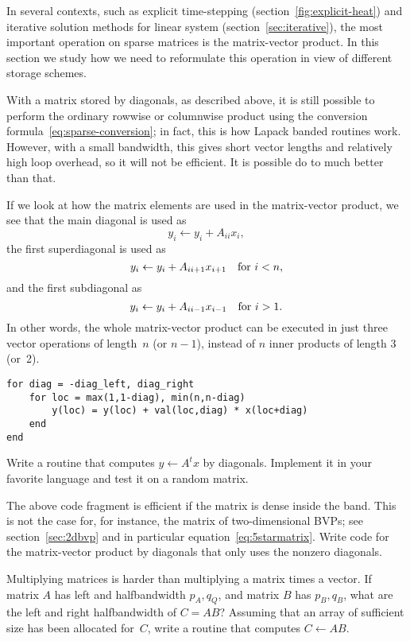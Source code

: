 In several contexts,
such as explicit time-stepping (section~\ref{fig:explicit-heat})
and iterative solution methods for linear system (section~\ref{sec:iterative}),
the most important operation on sparse matrices is the matrix-vector
product.
In this section we study how we need to reformulate this operation
in view of different storage schemes.

With a matrix stored by diagonals, as described above, it is
still possible to perform the ordinary rowwise or columnwise product using the
conversion formula~\eqref{eq:sparse-conversion};
in fact, this is how Lapack banded routines work.
%
However, with
a small bandwidth, this gives short vector lengths and relatively high
loop overhead, so it will not be efficient. It is possible do to much
better than that.

If we look at how the matrix elements are used in the matrix-vector
product, we see that the main diagonal is used as
\[ y_i \leftarrow y_i + A_{ii} x_i, \]
the first superdiagonal is used as
\[ y_i \leftarrow y_i + A_{ii+1} x_{i+1}\quad\hbox{for $i<n$}, \]
and the first subdiagonal as
\[ y_i \leftarrow y_i + A_{ii-1} x_{i-1}\quad\hbox{for $i>1$}. \]
In other words, the whole matrix-vector product can be executed in
just three vector operations of length~$n$ (or $n-1$), instead of $n$
inner products of length 3 (or~2).

\begin{verbatim}
for diag = -diag_left, diag_right
    for loc = max(1,1-diag), min(n,n-diag)
        y(loc) = y(loc) + val(loc,diag) * x(loc+diag)
    end
end
\end{verbatim}

\begin{exercise}
  Write a routine that computes $y\leftarrow A^tx$ by
  diagonals. Implement it in your favorite language and test it on a
  random matrix.
\end{exercise}
\begin{exercise}
  The above code fragment is efficient if the matrix is dense inside
  the band. This is not the case for, for instance, the matrix of 
  two-dimensional \acp{BVP}; see section~\ref{sec:2dbvp} and in
  particular equation~\eqref{eq:5starmatrix}. Write code for the
  matrix-vector product by diagonals that only
  uses the nonzero diagonals.
\end{exercise}
\begin{exercise}
  Multiplying matrices is harder than multiplying a matrix times a
  vector. If matrix $A$ has left and halfbandwidth $p_A,q_Q$, and
  matrix $B$ has $p_B,q_B$, what are the left and right halfbandwidth
  of $C=AB$? Assuming that an array of sufficient size has been
  allocated for~$C$, write a routine that computes $C\leftarrow AB$.
\end{exercise}

